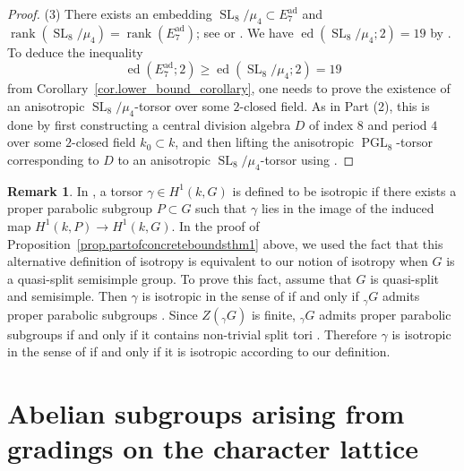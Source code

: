 \documentclass[12pt]{amsart}
\numberwithin{equation}{section}
\theoremstyle{definition}
\newtheorem{remark}[theorem]{Remark}
\newcommand{\ad}{\mathrm{ad}}
\newcommand{\PGL}{\operatorname{PGL}}
\newcommand{\SL}{\operatorname{SL}}
\newcommand{\ed}{\operatorname{ed}}
\newcommand{\rank}{\operatorname{rank}}
\begin{document}
\begin{proof}
     \smallskip
    (3) There exists an embedding  $\SL_8/\mu_4 \subset E_7^{\ad}$ and $\rank(\SL_8/\mu_4) = \rank(E_7^{\ad})$; see \cite[Corollary 4.2]{cohen1987finite} or \cite[Table 4]{duan2013isomorphism}.  We have $\ed(\SL_8/\mu_4;2) = 19$ by \cite[Corollary 1.2]{chernousov2013essential}. To deduce the inequality $$\ed(E_7^{\ad};2)\geq  \ed(\SL_8/\mu_4;2) = 19$$ from Corollary~\ref{cor.lower_bound_corollary}, one needs to prove  the existence of an anisotropic $\SL_8/\mu_4$-torsor over some $2$-closed field. As in Part (2), this is done by first constructing a central division algebra $D$ of index $8$ and period $4$ over some $2$-closed field $k_0\subset k$, and then lifting the anisotropic $\PGL_8$-torsor corresponding to $D$ to an anisotropic $\SL_8/\mu_4$-torsor using  \cite[Lemma 5.3]{ofek2022reduction}. 
\end{proof}


\begin{remark}\label{rem.notions_of_isotropy}
    In \cite{ofek2022reduction}, a torsor $\gamma\in H^1(k,G)$ is defined to be isotropic if there exists a proper parabolic subgroup $P \subset G$ such that $\gamma$ lies in the image of the induced map $H^1(k,P)\to H^1(k,G)$. In the proof of Proposition~\ref{prop.partofconcreteboundsthm1} above, we used the fact that this alternative definition of isotropy is equivalent to our notion of isotropy when $G$ is a quasi-split semisimple group. To prove this fact, assume that $G$ is quasi-split and semisimple. Then $\gamma$ is isotropic in the sense of \cite{ofek2022reduction} if and only if ${}_\gamma G$ admits proper parabolic subgroups \cite[Lemma 2.2]{ofek2022reduction}. Since $Z({}_\gamma G)$ is finite, ${}_\gamma G$ admits proper parabolic subgroups if and only if it contains non-trivial split tori \cite[Corollary 4.17]{borel1965groupes}. Therefore $\gamma$ is isotropic in the sense of \cite{ofek2022reduction} if and only if it is isotropic according to our definition.
\end{remark}

\section{Abelian subgroups arising from gradings on the character lattice}\label{sect.gradings_on_char}
\end{document}
